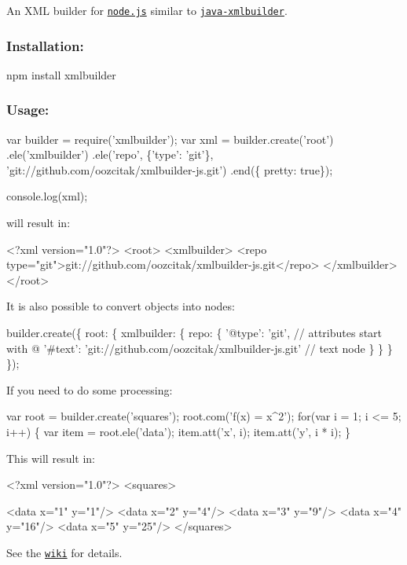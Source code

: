 An X\+ML builder for \href{https://nodejs.org/}{\tt node.\+js} similar to \href{https://github.com/jmurty/java-xmlbuilder}{\tt java-\/xmlbuilder}.

\href{http://opensource.org/licenses/MIT}{\tt } \href{https://npmjs.com/package/xmlbuilder}{\tt } \href{https://npmjs.com/package/xmlbuilder}{\tt }

\href{http://travis-ci.org/oozcitak/xmlbuilder-js}{\tt } \href{https://david-dm.org/oozcitak/xmlbuilder-js}{\tt } \href{https://coveralls.io/github/oozcitak/xmlbuilder-js}{\tt }

\subsubsection*{Installation\+:}


\begin{DoxyCode}
npm install xmlbuilder
\end{DoxyCode}


\subsubsection*{Usage\+:}


\begin{DoxyCode}
var builder = require('xmlbuilder');
var xml = builder.create('root')
  .ele('xmlbuilder')
    .ele('repo', \{'type': 'git'\}, 'git://github.com/oozcitak/xmlbuilder-js.git')
  .end(\{ pretty: true\});

console.log(xml);
\end{DoxyCode}


will result in\+:


\begin{DoxyCode}
<?xml version="1.0"?>
<root>
  <xmlbuilder>
    <repo type="git">git://github.com/oozcitak/xmlbuilder-js.git</repo>
  </xmlbuilder>
</root>
\end{DoxyCode}


It is also possible to convert objects into nodes\+:


\begin{DoxyCode}
builder.create(\{
  root: \{
    xmlbuilder: \{
      repo: \{
        '@type': 'git', // attributes start with @
        '#text': 'git://github.com/oozcitak/xmlbuilder-js.git' // text node
      \}
    \}
  \}
\});
\end{DoxyCode}


If you need to do some processing\+:


\begin{DoxyCode}
var root = builder.create('squares');
root.com('f(x) = x^2');
for(var i = 1; i <= 5; i++)
\{
  var item = root.ele('data');
  item.att('x', i);
  item.att('y', i * i);
\}
\end{DoxyCode}


This will result in\+:


\begin{DoxyCode}
<?xml version="1.0"?>
<squares>
  
  <data x="1" y="1"/>
  <data x="2" y="4"/>
  <data x="3" y="9"/>
  <data x="4" y="16"/>
  <data x="5" y="25"/>
</squares>
\end{DoxyCode}


See the \href{https://github.com/oozcitak/xmlbuilder-js/wiki}{\tt wiki} for details. 
